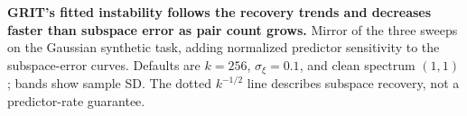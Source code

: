 \textbf{GRIT's fitted instability follows the recovery trends and decreases faster than subspace error as pair count grows.} Mirror of the three sweeps on the Gaussian synthetic task, adding normalized predictor sensitivity to the subspace-error curves. Defaults are $k=256$, $\sigma_\xi=0.1$, and clean spectrum $(1,1)$; bands show sample SD. The dotted $k^{-1/2}$ line describes subspace recovery, not a predictor-rate guarantee.
